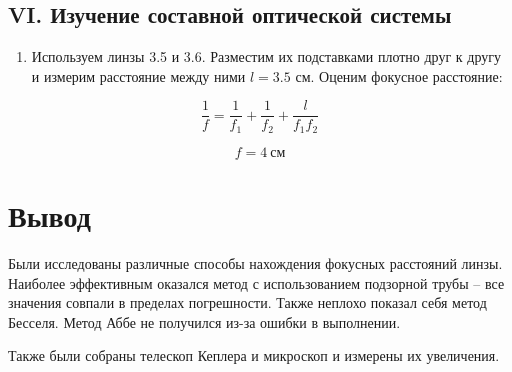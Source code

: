 \documentclass[a4paper,12pt]{article}
\begin{document}
\clearpage

\subsection*{VI. Изучение составной оптической системы}

\begin{enumerate}
    \item Используем линзы 3.5 и 3.6. Разместим их подставками плотно друг к другу и измерим расстояние между ними $l = 3.5$ см. Оценим фокусное расстояние:
\end{enumerate}

\begin{equation*}
    \frac{1}{f} = \frac{1}{f_1} + \frac{1}{f_2} + \frac{l}{f_1 f_2}
\end{equation*}

\begin{equation*}
    f = 4 \ \text{см}
\end{equation*}

\section{Вывод}

Были исследованы различные способы нахождения фокусных расстояний линзы. Наиболее эффективным оказался метод с использованием подзорной трубы -- все значения совпали в пределах погрешности. Также неплохо показал себя метод Бесселя. Метод Аббе не получился из-за ошибки в выполнении.

Также были собраны телескоп Кеплера и микроскоп и измерены их увеличения.
\end{document}

